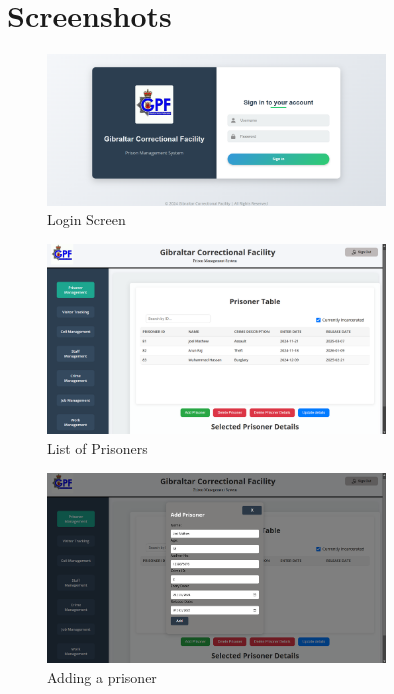 \chapter{Screenshots}%
    \begin{figure}[H]
        \centering
        \includegraphics[width=0.8\textwidth]{screenshots/login.png}
        \caption{Login Screen}
        \label{fig:login}
    \end{figure}
    \begin{figure}[H]
        \centering
        \includegraphics[width=0.8\textwidth]{screenshots/prisoner.png}
        \caption{List of Prisoners}
        \label{fig:prisoner}
    \end{figure}
    \begin{figure}[H]
        \centering
        \includegraphics[width=0.8\textwidth]{screenshots/addprisoner.png}
        \caption{Adding a prisoner}
        \label{fig:addp}
    \end{figure}
